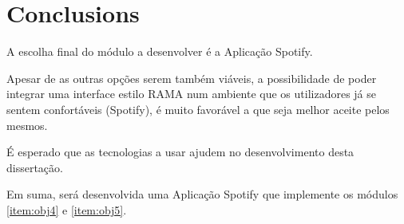 

\section{Conclusions}

  A escolha final do módulo a desenvolver é a Aplicação Spotify.

  Apesar de as outras opções serem também viáveis, a possibilidade de poder integrar uma interface estilo RAMA num ambiente que os utilizadores já se sentem confortáveis (Spotify), é muito favorável a que seja melhor aceite pelos mesmos.

  É esperado que as tecnologias a usar ajudem no desenvolvimento desta dissertação.

  Em suma, será desenvolvida uma Aplicação Spotify que implemente os módulos \ref{item:obj4} e \ref{item:obj5}.